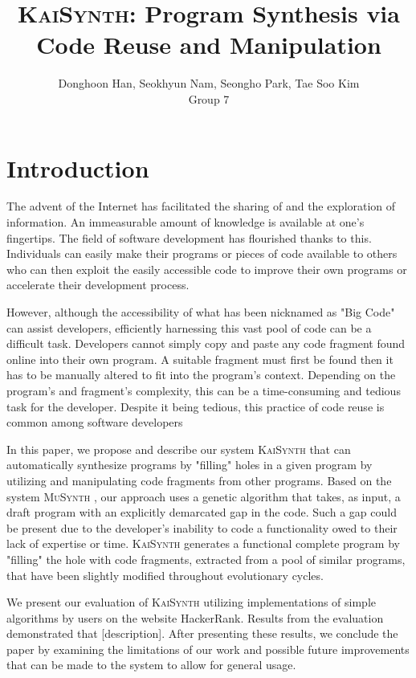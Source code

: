 \documentclass{article}
\title{\textsc{KaiSynth}: Program Synthesis via Code Reuse and Manipulation}
\author{Donghoon Han, Seokhyun Nam, Seongho Park, Tae Soo Kim\\Group 7}
\begin{document}
\maketitle

\section{Introduction}
The advent of the Internet has facilitated the sharing of and the exploration of information. An immeasurable amount of knowledge is available at one's fingertips. The field of software development has flourished thanks to this. Individuals can easily make their programs or pieces of code available to others who can then exploit the easily accessible code to improve their own programs or accelerate their development process.

However, although the accessibility of what has been nicknamed as "Big Code" can assist developers, efficiently harnessing this vast pool of code can be a difficult task. Developers cannot simply copy and paste any code fragment found online into their own program. A suitable fragment must first be found then it has to be manually altered to fit into the program's context. Depending on the program's and fragment's complexity, this can be a time-consuming and tedious task for the developer. Despite it being tedious, this practice of code reuse is common among software developers 

In this paper, we propose and describe our system \textsc{KaiSynth} that can automatically synthesize programs by "filling" holes in a given program by utilizing and manipulating code fragments from other programs. Based on the system \textsc{MuSynth} \citep{musynth}, our approach uses a genetic algorithm that takes, as input, a draft program with an explicitly demarcated gap in the code. Such a gap could be present due to the developer's inability to code a functionality owed to their lack of expertise or time. \textsc{KaiSynth} generates a functional complete program by "filling" the hole with code fragments, extracted from a pool of similar programs, that have been slightly modified throughout evolutionary cycles. 

We present our evaluation of \textsc{KaiSynth} utilizing implementations of simple algorithms by users on the website HackerRank. Results from the evaluation demonstrated that [description]. After presenting these results, we conclude the paper by examining the limitations of our work and possible future improvements that can be made to the system to allow for general usage.
\end{document}
